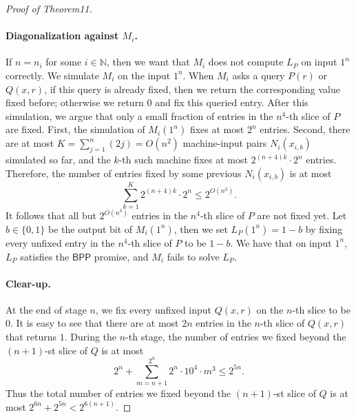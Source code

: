 \documentclass[10pt,a4paper]{article}
\begin{document}
\begin{proof}[Proof of Theorem11]
\paragraph{Diagonalization against $M_i$.}
If $n=n_i$ for some $i\in\mathbb N$, then we want that $M_i$ does not compute $L_P$ on input $1^n$ correctly. We simulate $M_i$ on the input $1^n$. When $M_i$ asks a query $P(r)$ or $Q(x,r)$, if this query is already fixed, then we return the corresponding value fixed before; otherwise we return $0$ and fix this queried entry.
After this simulation, we argue that only a small fraction of entries in the $n^4$-th slice of $P$ are fixed. First, the simulation of $M_i(1^n)$ fixes at most $2^n$ entries. Second, there are at most $K=\sum_{j=1}^n(2j)=O(n^2)$ machine-input pairs $N_i(x_{i,b})$ simulated so far, and the $k$-th such machine fixes at most $2^{(n+4)k}\cdot2^n$ entries. Therefore, the number of entries fixed by some previous $N_i(x_{i,b})$ is at most
\[\sum_{k=1}^K2^{(n+4)k}\cdot2^n\leq2^{O(n^3)}.\]
It follows that all but $2^{O(n^3)}$ entries in the $n^4$-th slice of $P$ are not fixed yet. Let $b\in\{0,1\}$ be the output bit of $M_i(1^n)$, then we set $L_P(1^n)=1-b$ by fixing every unfixed entry in the $n^4$-th slice of $P$ to be $1-b$. We have that on input $1^n$, $L_P$ satisfies the $\mathsf{BPP}$ promise, and $M_i$ fails to solve $L_P$.
\paragraph{Clear-up.}
At the end of stage $n$, we fix every unfixed input $Q(x,r)$ on the $n$-th slice to be $0$. It is easy to see that there are at most $2n$ entries in the $n$-th slice of $Q(x,r)$ that returns $1$.
During the $n$-th stage, the number of entries we fixed beyond the $(n+1)$-st slice of $Q$ is at most
\[2^n+\sum_{m=n+1}^{2^n}2^n\cdot10^4\cdot m^3\leq2^{5n}.\]
Thus the total number of entries we fixed beyond the $(n+1)$-st slice of $Q$ is at most $2^{6n}+2^{5n}<2^{6(n+1)}$.
\end{proof}
\end{document}
